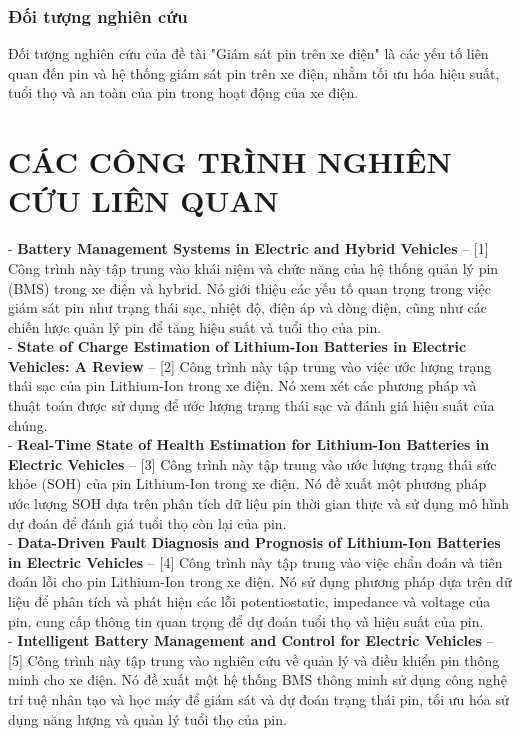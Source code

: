 \documentclass[a4paper,11pt]{article}
\theoremstyle{mytheor}
\begin{document}
\subsubsection{Đối tượng nghiên cứu }
Đối tượng nghiên cứu của đề tài "Giám sát pin trên xe điện" là các yếu tố liên quan đến pin và hệ thống giám sát pin trên xe điện, nhằm tối ưu hóa hiệu suất, tuổi thọ và an toàn của pin trong hoạt động của xe điện.

\section{CÁC CÔNG TRÌNH NGHIÊN CỨU LIÊN QUAN }
- \textbf{Battery Management Systems in Electric and Hybrid Vehicles} – [1] Công trình này tập trung vào khái niệm và chức năng của hệ thống quản lý pin (BMS) trong xe điện và hybrid. Nó giới thiệu các yếu tố quan trọng trong việc giám sát pin như trạng thái sạc, nhiệt độ, điện áp và dòng điện, cũng như các chiến lược quản lý pin để tăng hiệu suất và tuổi thọ của pin.\\

- \textbf{State of Charge Estimation of Lithium-Ion Batteries in Electric Vehicles: A Review} – [2] Công trình này tập trung vào việc ước lượng trạng thái sạc của pin Lithium-Ion trong xe điện. Nó xem xét các phương pháp và thuật toán được sử dụng để ước lượng trạng thái sạc và đánh giá hiệu suất của chúng.\\

- \textbf{Real-Time State of Health Estimation for Lithium-Ion Batteries in Electric Vehicles} – [3] Công trình này tập trung vào ước lượng trạng thái sức khỏe (SOH) của pin Lithium-Ion trong xe điện. Nó đề xuất một phương pháp ước lượng SOH dựa trên phân tích dữ liệu pin thời gian thực và sử dụng mô hình dự đoán để đánh giá tuổi thọ còn lại của pin.\\

- \textbf{Data-Driven Fault Diagnosis and Prognosis of Lithium-Ion Batteries in Electric Vehicles} – [4] Công trình này tập trung vào việc chẩn đoán và tiên đoán lỗi cho pin Lithium-Ion trong xe điện. Nó sử dụng phương pháp dựa trên dữ liệu để phân tích và phát hiện các lỗi potentiostatic, impedance và voltage của pin, cung cấp thông tin quan trọng để dự đoán tuổi thọ và hiệu suất của pin.\\

- \textbf{Intelligent Battery Management and Control for Electric Vehicles} – [5] Công trình này tập trung vào nghiên cứu về quản lý và điều khiển pin thông minh cho xe điện. Nó đề xuất một hệ thống BMS thông minh sử dụng công nghệ trí tuệ nhân tạo và học máy để giám sát và dự đoán trạng thái pin, tối ưu hóa sử dụng năng lượng và quản lý tuổi thọ của pin.\\
\end{document}
